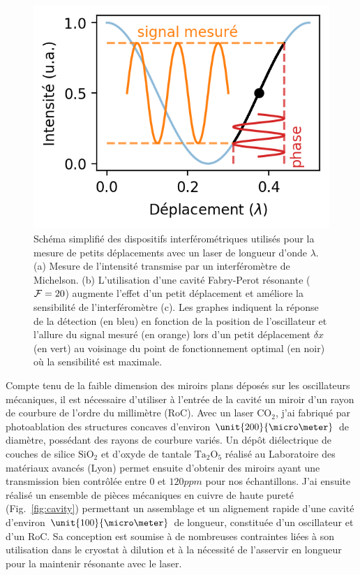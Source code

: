 \documentclass[12pt,a4paper]{article}
\newcommand{\uroc}{\micro RoC}
\begin{document}
\begin{figure}
\includegraphics[scale=0.75]{figures/michelson_and_cavity_response.png}
\caption{Schéma simplifié des dispositifs interférométriques utilisés pour la mesure de petits déplacements avec un laser de longueur d'onde $\lambda$.
(a) Mesure de l'intensité transmise par un interféromètre de Michelson.
(b) L'utilisation d'une cavité Fabry-Perot résonante (${\cal{F}}=20$) augmente l'effet d'un petit déplacement et améliore la sensibilité de l'interféromètre (c).
Les graphes indiquent la réponse de la détection (en bleu) en fonction de la position de l'oscillateur et l'allure du signal mesuré (en orange) lors d'un petit déplacement $\delta x$ (en vert) au voisinage du point de fonctionnement optimal (en noir) où la sensibilité est maximale.}
\label{fig:detection_scheme}
\end{figure}

Compte tenu de la faible dimension des miroirs plans déposés sur les oscillateurs mécaniques, il est nécessaire d'utiliser à l'entrée de la cavité un miroir d'un rayon de courbure de l'ordre du millimètre (\uroc).
Avec un laser $\mathrm{CO_2}$, j'ai fabriqué par photoablation des structures concaves d'environ $\unit{200}{\micro\meter}$ de diamètre, possédant des rayons de courbure variés.
Un dépôt diélectrique de couches de silice $\mathrm{SiO_2}$ et d'oxyde de tantale $\mathrm{Ta_2O_5}$ réalisé au Laboratoire des matériaux avancés (Lyon) permet ensuite d'obtenir des miroirs ayant une transmission bien contrôlée entre 0 et $\unit{120}{ppm}$ pour nos échantillons.
J'ai ensuite réalisé un ensemble de pièces mécaniques en cuivre de haute pureté (Fig.~\ref{fig:cavity}) permettant un assemblage et un alignement rapide d'une cavité d'environ $\unit{100}{\micro\meter}$ de longueur, constituée d'un oscillateur et d'un \uroc.
Sa conception est soumise à de nombreuses contraintes liées à son utilisation dans le cryostat à dilution et à la nécessité de l'asservir en longueur pour la maintenir résonante avec le laser.
\end{document}
